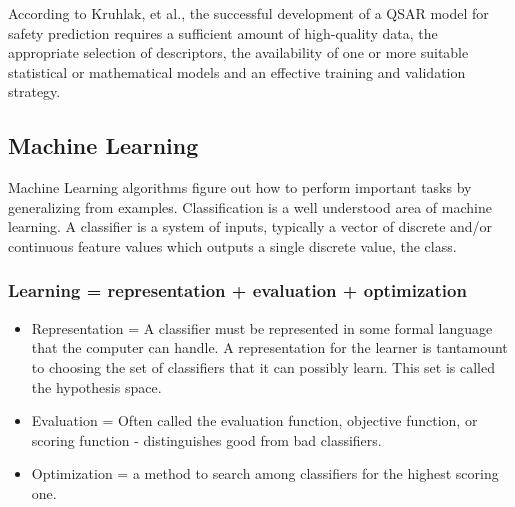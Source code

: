 According to Kruhlak, et al., the successful development of a QSAR model for safety prediction requires a sufficient amount of high-quality data, the appropriate selection of descriptors, the availability of one or more suitable statistical or mathematical models and an effective training and validation strategy.




\subsection{Machine Learning}

Machine Learning algorithms figure out how to perform important tasks by generalizing from examples. Classification is a well understood area of machine learning. A classifier is a system of inputs, typically a vector of discrete and/or continuous feature values which outputs a single discrete value, the class.\cite{Domingos2012}

\subsubsection*{Learning = representation + evaluation + optimization}

\begin{itemize}
\item Representation = A classifier must be represented in some formal language that the computer can handle. A representation for the learner is tantamount to choosing the set of classifiers that it can possibly learn. This set is called the hypothesis space.

\item Evaluation = Often called the evaluation function, objective function, or scoring function - distinguishes good from bad classifiers.

\item Optimization = a method to search among classifiers for the highest scoring one.

\end{itemize}

